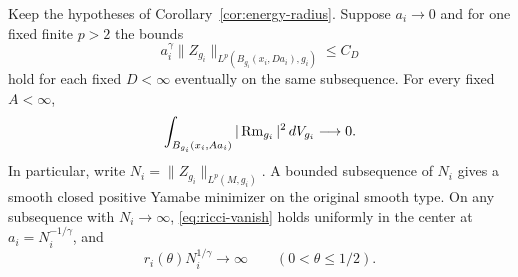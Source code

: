 \begin{theorem}\label{thm:ricci-scale}
Keep the hypotheses of Corollary~\ref{cor:energy-radius}. Suppose
\(a_i\to0\) and for one fixed finite \(p>2\) the bounds
\[
  a_i^\gamma\|Z_{g_i}\|_{L^p(B_{g_i}(x_i,D a_i),g_i)}
       \le C_D
\]
hold for each fixed \(D<\infty\) eventually on the same subsequence.
For every fixed \(A<\infty\),
\begin{equation}\label{eq:ricci-vanish}
 \int_{B_{g_i}(x_i,A a_i)}|\operatorname{Rm}_{g_i}|^2\,dV_{g_i}\longrightarrow0 .
\end{equation}
In particular, write \(N_i=\|Z_{g_i}\|_{L^p(M,g_i)}\). A bounded
subsequence of \(N_i\) gives a smooth closed positive Yamabe
minimizer on the original smooth type. On any subsequence with
\(N_i\to\infty\), \eqref{eq:ricci-vanish} holds uniformly in the
center at \(a_i=N_i^{-1/\gamma}\), and
\[
              r_i(\theta)N_i^{1/\gamma}\longrightarrow\infty
              \qquad(0<\theta\le1/2).
\]
\end{theorem}

